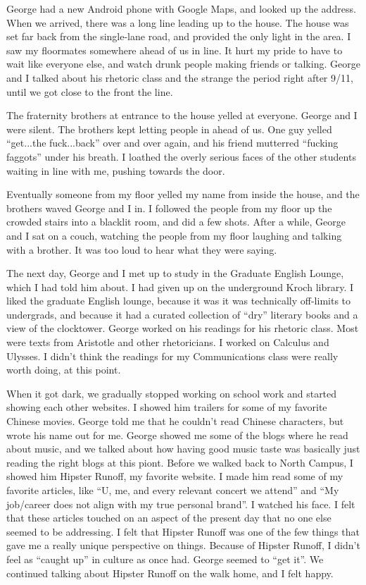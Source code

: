 George had a new Android phone with Google Maps, and looked up the address.
When we arrived, there was a long line leading up to the house.  The house was
set far back from the single-lane road, and provided the only light in the area.
I saw my floormates somewhere ahead of us in line.   It hurt my pride to have to
wait like everyone else, and watch drunk people making friends or talking.
George and I talked about his rhetoric class and the strange the period right
after 9/11, until we got close to the front the line.
 
The fraternity brothers at entrance to the house yelled at everyone.  George and
I were silent.  The brothers kept letting people in ahead of us.  One guy yelled
``get...the fuck...back'' over and over again, and his friend mutterred
``fucking faggots'' under his breath.  I loathed the overly serious faces of the
other students waiting in line with me, pushing towards the door.

Eventually someone from my floor yelled my name from inside the house, and the
brothers waved George and I in.  I followed the people from my floor up the
crowded stairs into a blacklit room, and did a few shots.  After a while, George
and I sat on a couch, watching the people from my floor laughing and talking
with a brother.  It was too loud to hear what they were saying.

The next day, George and I met up to study in the Graduate English Lounge, which
I had told him about.  I had given up on the underground Kroch library.  I liked
the graduate English lounge, because it was it was technically off-limits to
undergrads, and because it had a curated collection of ``dry'' literary books
and a view of the clocktower.  George worked on his readings for his rhetoric
class.  Most were texts from Aristotle and other rhetoricians.  I worked on
Calculus and Ulysses.  I didn't think the readings for my Communications class
were really worth doing, at this point.

When it got dark, we gradually stopped working on school work and started
showing each other websites.  I showed him trailers for some of my favorite
Chinese movies.  George told me that he couldn't read Chinese characters, but
wrote his name out for me.  George showed me some of the blogs where he read
about music, and we talked about how having good music taste was basically just
reading the right blogs at this piont.  Before we walked back to North Campus, I
showed him Hipster Runoff, my favorite website.  I made him read some of my
favorite articles, like ``U, me, and every relevant concert we attend'' and ``My
job/career does not align with my true personal brand''.  I watched his face.  I
felt that these articles touched on an aspect of the present day that no one
else seemed to be addressing.  I felt that Hipster Runoff was one of the few
things that gave me a really unique perspective on things.  Because of Hipster
Runoff, I didn't feel as ``caught up'' in culture as once had.   George seemed
to ``get it''.   We continued talking about Hipster Runoff on the walk home, and
I felt happy.


